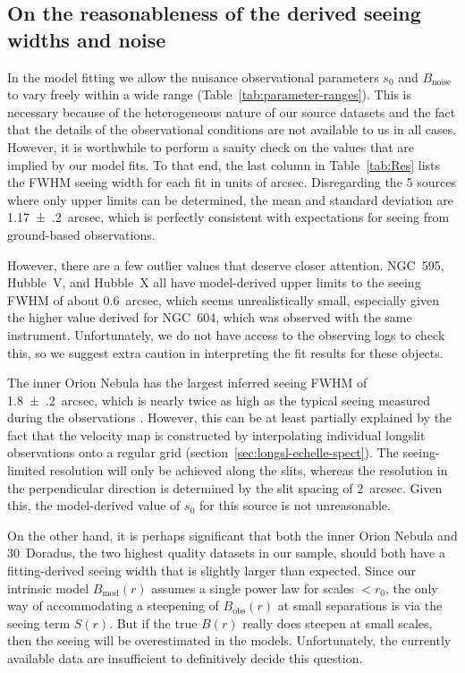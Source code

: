 \documentclass[fleqn,usenatbib, useAMS, a4paper]{mnras}
\newcommand\startNEW{\color{black}}
\newcommand\stopNEW{\color{black}}
\newcommand\NEW[1]{\startNEW #1\stopNEW\relax}
\newcommand\noise{\ensuremath{_{\text{noise}}}}
\newcommand\obs{\ensuremath{_{\mathrm{obs}}}}
\newcommand\model{\ensuremath{_{\mathrm{mod}}}}
\begin{document}
\subsection{On the reasonableness of the derived seeing widths and noise}
\label{sec:sanity-check-derived}
In the model fitting we allow the nuisance observational parameters
\(s_0\) and \(B\noise\) to vary freely within a wide range
(Table~\ref{tab:parameter-ranges}).
This is necessary because of the heterogeneous nature of our source datasets
and the fact that the details of the observational conditions
are not available to us in all cases.
However, it is worthwhile to perform a sanity check on the values that are implied by our model fits.
To that end, the last column in Table~\ref{tab:Res} lists the FWHM seeing width for each fit in units of arcsec.
Disregarding the 5 sources where only upper limits can be determined,
the mean and standard deviation are \SI{1.17(20)}{arcsec},
which is perfectly consistent with expectations for seeing from ground-based observations.

\startNEW
However, there are a few outlier values that deserve closer attention.
NGC~595, Hubble~V, and Hubble~X all have model-derived upper limits to the
seeing FWHM of about \SI{0.6}{arcsec}, which seems
unrealistically small, especially given the higher value
derived for NGC~604,
which was observed with the same instrument.
Unfortunately, we do not have access to the observing logs to check this,
so we suggest extra caution in interpreting the fit results for these objects. 
\stopNEW

The inner Orion Nebula has the largest inferred seeing FWHM of \NEW{\SI{1.8(2)}{arcsec}},
which is \NEW{nearly twice as high as} the typical seeing measured during the observations
\citep{Doi:2004a}.
However, this can be at least partially explained by the fact that the velocity map is constructed
by interpolating individual longslit observations onto a regular grid
(section~\ref{sec:longsl-echelle-spect}).
The seeing-limited resolution will only be achieved along the slits,
whereas the resolution in the perpendicular direction is determined by the slit spacing of \SI{2}{arcsec}.
Given this, the model-derived value of \(s_0\) for this source is not unreasonable.

On the other hand, it is perhaps significant that both
the inner Orion Nebula and 30~Doradus,
the two highest quality datasets in our sample,
should both have a fitting-derived seeing width that is
slightly larger than expected.
Since our intrinsic model \(B\model(r)\) assumes a single power law
for scales \(<r_0\),
the only way of accommodating a steepening of \(B\obs(r)\) at small separations
is via the seeing term \(S(r)\).
But if the true \(B(r)\) really does steepen at small scales,
then the seeing will be overestimated in the models.
Unfortunately, the currently available data are insufficient to
definitively decide this question.
\end{document}
